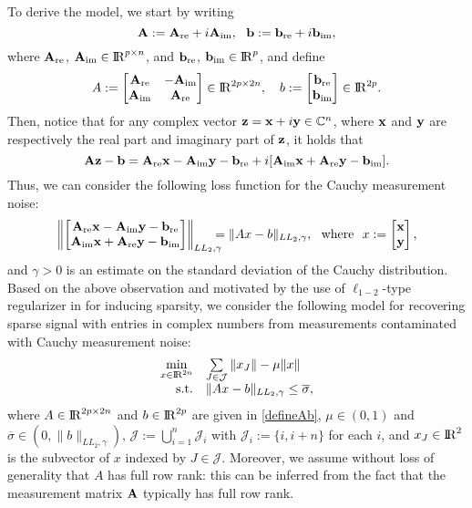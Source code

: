 \documentclass[10pt]{article}
\numberwithin{equation}{section}
\def\R{{\rm I\!R}}
\def\hx{{\widehat x}}
\begin{document}
{To derive the model, we start by writing
\[
{\bf A} := {\bf A}_{\rm re} + i {\bf A}_{\rm im}, \ \ {\bf b} := {\bf b}_{\rm re} + i {\bf b}_{\rm im},
\]
where ${\bf A}_{\rm re}$, ${\bf A}_{\rm im}\in \R^{p\times n}$, and ${\bf b}_{\rm re}$, ${\bf b}_{\rm im}\in \R^{p}$, and define
\begin{equation}\label{defineAb}
A := \begin{bmatrix}
{\bf A}_{\rm re} & -{\bf A}_{\rm im}\\
{\bf A}_{\rm im} & {\bf A}_{\rm re}
\end{bmatrix}\in \R^{2p\times 2n},\ \ \ b:= \begin{bmatrix}
  {\bf b}_{\rm re}\\{\bf b}_{\rm im}
\end{bmatrix}\in \R^{2p}.
\end{equation}
Then, notice that for any complex vector ${\bf z} = {\bf x} + i {\bf y}\in {\mathbb{C}}^n$, where ${\bf x}$ and ${\bf y}$ are respectively the real part and imaginary part of ${\bf z}$, it holds that
\[
{\bf A}{\bf z} - {\bf b} = {\bf A}_{\rm re}{\bf x} - {\bf A}_{\rm im}{\bf y} - {\bf b}_{\rm re} + i [{\bf A}_{\rm im}{\bf x} + {\bf A}_{\rm re}{\bf y} - {\bf b}_{\rm im}].
\]
Thus, we can consider the following loss function for the Cauchy measurement noise:
\[
\left\|
\begin{bmatrix}
  {\bf A}_{\rm re}{\bf x} - {\bf A}_{\rm im}{\bf y} - {\bf b}_{\rm re}\\
  {\bf A}_{\rm im}{\bf x} + {\bf A}_{\rm re}{\bf y} - {\bf b}_{\rm im}
\end{bmatrix} \right\|_{LL_2,\gamma} \!\!\!\!\! = \|Ax - b\|_{LL_2,\gamma},\ \ {\rm where}\ \ x := \begin{bmatrix}
  {\bf x}\\{\bf y}
\end{bmatrix},
\]
and $\gamma > 0$ is an estimate on the standard deviation of the Cauchy distribution.
Based on the above observation and motivated by the use of $\ell_{1-2}$-type regularizer in \cite{YiLH15} for inducing sparsity, we consider the following model for recovering sparse signal with entries in complex numbers from measurements contaminated with Cauchy measurement noise:
\begin{equation}\label{E2}
  \begin{array}{rl}
\min\limits_{x\in\R^{2n}} & \sum\limits_{J\in\mathcal{J}}\|x_J\| - \mu\|x\| \\
{\rm s.t.} & \|Ax - b\|_{LL_2,\gamma}\leq \overline{\sigma},
  \end{array}
\end{equation}
where $A\in\R^{2p\times 2n}$ and $b\in \R^{2p}$ are given in \eqref{defineAb}, $\mu \in (0,1)$ and $\overline{\sigma} \in (0,\|b\|_{LL_2,\gamma})$, $\mathcal{J} := \bigcup_{i=1}^n\mathcal{J}_i$ with $\mathcal{J}_i := \{i,i+n\}$ for each $i$, and $x_J\in\R^2$ is the subvector of $x$ indexed by $J\in\mathcal{J}$. Moreover, we assume without loss of generality that $A$ has full row rank: this can be inferred from the fact that the measurement matrix ${\bf A}$ typically has full row rank. %

}
\end{document}
